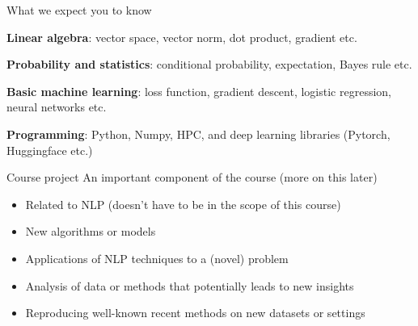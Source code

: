\documentclass[usenames,dvipsnames,notes,11pt,aspectratio=169]{beamer}
\begin{document}
\begin{frame}
    {What we expect you to know}
    \begin{wideitemize}
        \item \textbf{Linear algebra}: vector space, vector norm, dot product, gradient etc.
        \item \textbf{Probability and statistics}: conditional probability, expectation, Bayes rule etc.
        \item \textbf{Basic machine learning}: loss function, gradient descent, logistic regression, neural networks etc.
        \item \textbf{Programming}: Python, Numpy, HPC, and deep learning libraries (Pytorch, Huggingface etc.)
    \end{wideitemize}
\end{frame}

\begin{frame}
    {Course project}
    An important component of the course (more on this later)
    \begin{itemize}
        \itemsep1em
        \item Related to NLP (doesn't have to be in the scope of this course)
        \item New algorithms or models
        \item Applications of NLP techniques to a (novel) problem
        \item Analysis of data or methods that potentially leads to new insights
        \item Reproducing well-known recent methods on new datasets or settings 
    \end{itemize}
\end{frame}
\end{document}
